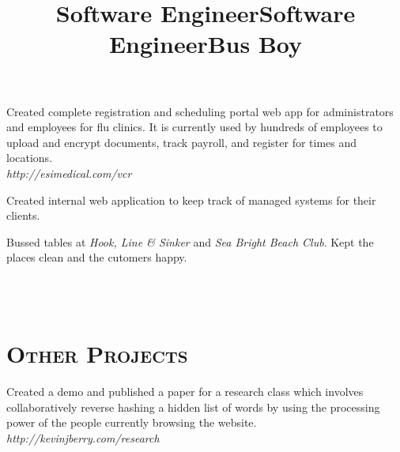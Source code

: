 \begin{resume}
\title{Software Engineer}
\begin{position}
Created complete registration and scheduling portal web app for administrators
and employees for flu clinics. It is currently used by hundreds of employees to
upload and encrypt documents, track payroll, and register for times and locations.
\\ {\itshape http://esimedical.com/vcr}
\end{position}

\title{Software Engineer}
\begin{position}
Created internal web application to keep track of managed systems for their
clients.
\end{position}

\title{Bus Boy}
\begin{position}
Bussed tables at {\itshape Hook, Line \& Sinker} and {\itshape Sea Bright Beach
Club}. Kept the places clean and the cutomers happy.
\end{position}



\begin{formatb}
  \\
  \body\\
\end{formatb}

\section{\textsc{Other Projects}}

\begin{position}
Created a demo and published a paper for a research class which involves
collaboratively reverse hashing a hidden list of words by using the processing
power of the people currently browsing the website. \\
{\itshape http://kevinjberry.com/research}
\end{position}


\end{resume}
